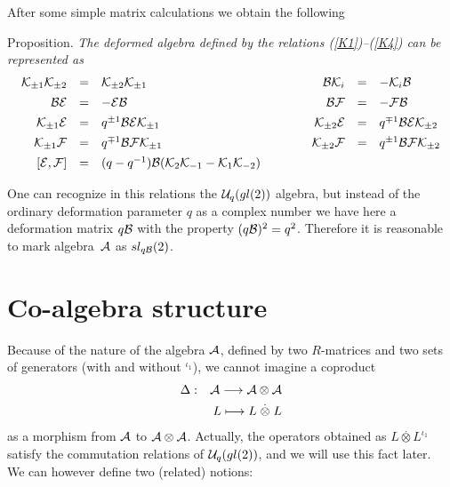 \documentclass[a4paper,a4paper]{article}
\def\cA{{\cal A}}          \def\cB{{\cal B}}          \def\cC{{\cal C}}
\begin{document}
After some simple matrix calculations we obtain the following
\medskip

\noindent
{\large \sc Proposition.} 
\textsl{The deformed algebra defined by the relations
(\ref{K1})--(\ref{K4}) can be represented as
\begin{eqnarray}
  \label{eq:commuL}
  \begin{array}{rclrcl}
    \cK_{\pm 1} \cK_{\pm 2} &=&  \cK_{\pm 2} \cK_{\pm 1} & \qquad\qquad
    \cB \cK_i &=& - \cK_i \cB \\[1.5mm]
    \cB \cE &=& - \cE \cB &
    \cB \cF &=& - \cF \cB \\[1.5mm]
    \cK_{\pm 1} \cE &=&  q^{\pm 1} \cB \cE \cK_{\pm 1} &
    \cK_{\pm 2} \cE &=&  q^{\mp 1} \cB \cE \cK_{\pm 2} \\[1.5mm]
    \cK_{\pm 1} \cF &=&  q^{\mp 1} \cB \cF \cK_{\pm 1} &
    \cK_{\pm 2} \cF &=&  q^{\pm 1} \cB \cF \cK_{\pm 2} \\[1.5mm]
    \left[\cE,\cF\right] &=& (q-q^{-1})\cB (\cK_2 \cK_{-1} - \cK_1 \cK_{-2})
  \end{array}
\end{eqnarray}
}

One can recognize in this relations the ${\cal U}_q(gl(2))$
algebra, but instead of the ordinary deformation parameter $q$
as a complex number we have here a deformation matrix $q \cB$ with the property
$(q \cB)^2= q^2$. Therefore it is reasonable to mark algebra~$\cA$ 
as $sl_{q\cB}(2)$.

\section{Co-algebra structure}
\setcounter{equation}{0}

\indent

Because of the nature of the algebra $\cA$, defined by two
$R$-matrices and two sets of generators (with and without
$^{\iota_1}$), we cannot imagine a coproduct 
\begin{eqnarray}
  \label{eq:Delta2}
  \Delta &:& \cA\longrightarrow \cA\otimes \cA  \nonumber\\
  && L \longmapsto L \stackrel{.}{\otimes} L
\end{eqnarray}
as a morphism from $\cA$ to $\cA\otimes\cA$. Actually, the operators
obtained as $L \stackrel{.}{\otimes} L^{\iota_1}$ satisfy the commutation
relations of ${\cal U}_q(gl(2))$, and we will use this fact later.
\\
We can however define two (related) notions: 
\end{document}
